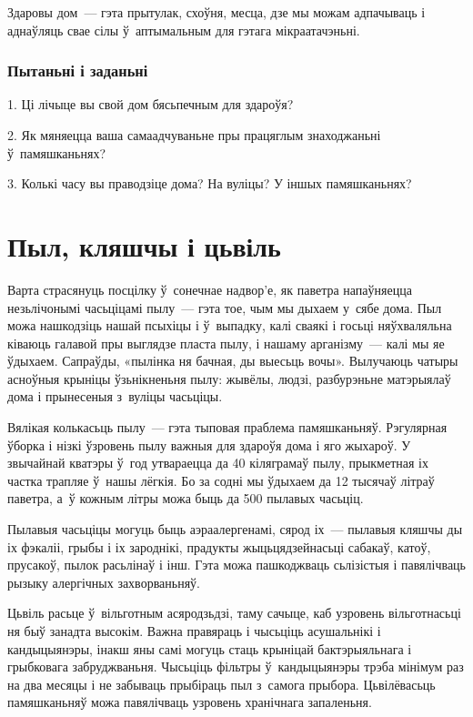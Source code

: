 Здаровы дом~--- гэта прытулак, схоўня, месца, дзе мы можам адпачываць і аднаўляць свае сілы ў~аптымальным для гэтага мікраатачэньні.

\subsubsection{Пытаньні і заданьні}

1. Ці лічыце вы свой дом бясьпечным для здароўя?

2. Як мяняецца ваша самаадчуваньне пры працяглым знаходжаньні ў~памяшканьнях?

3. Колькі часу вы праводзіце дома? На вуліцы? У іншых памяшканьнях?


\section{Пыл, кляшчы і цьвіль}

Варта страсянуць посцілку ў~сонечнае надвор'е, як паветра напаўняецца незьлічонымі часьціцамі пылу~--- гэта тое, чым мы дыхаем у~сябе дома. Пыл можа нашкодзіць нашай псыхіцы і ў~выпадку, калі сваякі і госьці няўхваляльна ківаюць галавой пры выглядзе пласта пылу, і нашаму арганізму~--- калі мы яе ўдыхаем. Сапраўды, «пылінка ня бачная, ды выесьць вочы». Вылучаюць чатыры асноўныя крыніцы ўзьнікненьня пылу: жывёлы, людзі, разбурэньне матэрыялаў дома і прынесеныя з~вуліцы часьціцы.

Вялікая колькасьць пылу~--- гэта тыповая праблема памяшканьняў. Рэгулярная ўборка і нізкі ўзровень пылу важныя для здароўя дома і яго жыхароў. У звычайнай кватэры ў~год утвараецца да 40 кіляграмаў пылу, прыкметная іх частка трапляе ў~нашы лёгкія. Бо за содні мы ўдыхаем да 12 тысячаў літраў паветра, а~ў кожным літры можа быць да 500 пылавых часьціц.

Пылавыя часьціцы могуць быць аэраалергенамі, сярод іх~--- пылавыя кляшчы ды іх фэкаліі, грыбы і іх зароднікі, прадукты жыцьцядзейнасьці сабакаў, катоў, прусакоў, пылок расьлінаў і інш. Гэта можа пашкоджваць сьлізістыя і павялічваць рызыку алергічных захворваньняў.

Цьвіль расьце ў~вільготным асяродзьдзі, таму сачыце, каб узровень вільготнасьці ня быў занадта высокім. Важна правяраць і чысьціць асушальнікі і кандыцыянэры, інакш яны самі могуць стаць крыніцай бактэрыяльнага і грыбковага забруджваньня. Чысьціць фільтры ў~кандыцыянэры трэба мінімум раз на два месяцы і не забываць прыбіраць пыл з~самога прыбора. Цьвілёвасьць памяшканьняў можа павялічваць узровень хранічнага запаленьня.

